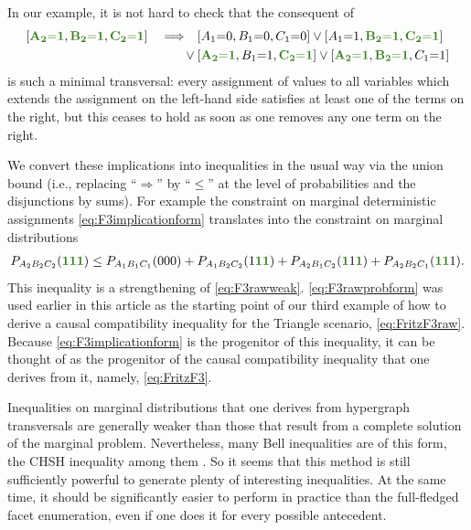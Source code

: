 {In our example, it is not hard to check that the consequent of
\begin{align}\begin{split}\label{eq:F3implicationform}
	\bracks{\mgreen{A_2 \eql 1}, \mgreen{B_2 \eql 1}, \mgreen{C_2 \eql 1}} \quad\Longrightarrow\quad &\bracks{A_1 \eql 0, B_1 \eql 0, C_1 \eql 0} \lor \bracks{A_1 \eql 1, \mgreen{B_2 \eql 1}, \mgreen{C_2 \eql 1}} \\
	\lor\: & \bracks{\mgreen{A_2 \eql 1}, B_1 \eql 1, \mgreen{C_2 \eql 1}} \lor \bracks{\mgreen{A_2 \eql 1}, \mgreen{B_2 \eql 1}, C_1 \eql 1}
\end{split}\end{align}
is such a minimal transversal: every assignment of values to all variables which extends the assignment on the left-hand side satisfies at least one of the terms on the right, but this ceases to hold as soon as one removes any one term on the right. 

We convert these implications into inequalities in the usual way via the union bound (i.e., replacing ``$\Rightarrow$'' by ``$\leq$'' at the level of probabilities and the disjunctions by sums). For example the constraint on marginal deterministic assignments \cref{eq:F3implicationform} translates into the constraint on marginal distributions
\begin{align}\label{eq:F3rawprobform}
    P_{A_2 B_2 C_2}\parens{\mgreen{1} \mgreen{1} \mgreen{1}} \leq P_{A_1 B_1 C_1}\parens{0 0 0}+P_{A_1 B_2 C_2}\parens{1 \mgreen{1 1}}+P_{A_2 B_1 C_2}\parens{\mgreen{1} 1 \mgreen{1}}+P_{A_2 B_2 C_1}\parens{\mgreen{1 1} 1}.
\end{align}
This inequality is a strengthening of \cref{eq:F3rawweak}.  \cref{eq:F3rawprobform} was used earlier in this article as the starting point of our third example of how to derive a causal compatibility inequality for the Triangle scenario, \cref{eq:FritzF3raw}. Because \cref{eq:F3implicationform} is the progenitor of this inequality, it can be thought of as the progenitor of the causal compatibility inequality that one derives from it, namely, \cref{eq:FritzF3}.  


Inequalities on marginal distributions that one derives from hypergraph transversals are generally weaker than those that result from a complete solution of the marginal problem. Nevertheless, many Bell inequalities are of this form, the CHSH inequality among them \cite{Ghirardi08}.  So it seems that this method is still sufficiently powerful to generate plenty of interesting inequalities. At the same time, it should be significantly easier to perform in practice than the full-fledged facet enumeration, even if one does it for every possible antecedent.

}
